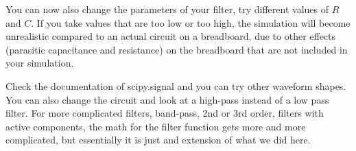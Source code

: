\documentclass[11pt]{article}
\begin{document}
You can now also change the parameters of your filter, try different
values of \(R\) and \(C\). If you take values that are too low or too
high, the simulation will become unrealistic compared to an actual
circuit on a breadboard, due to other effects (parasitic capacitance and
resistance) on the breadboard that are not included in your simulation.

Check the documentation of scipy.signal and you can try other waveform
shapes. You can also change the circuit and look at a high-pass instead
of a low pass filter. For more complicated filters, band-pass, 2nd or
3rd order, filters with active components, the math for the filter
function gets more and more complicated, but essentially it is just and
extension of what we did here.





    
\end{document}
